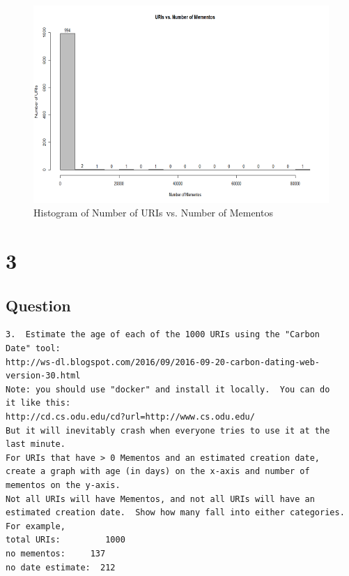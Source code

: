 \documentclass[letterpaper,11pt]{article}
\begin{document}

\begin{figure}[h]
\centering
\includegraphics[scale=1.0]{memuri.png}
\caption{Histogram of Number of URIs vs. Number of Mementos}
\label{fig:q2histogram}
\end{figure}
\clearpage
\section*{3}
\subsection*{Question}
\begin{verbatim}
3.  Estimate the age of each of the 1000 URIs using the "Carbon
Date" tool:
http://ws-dl.blogspot.com/2016/09/2016-09-20-carbon-dating-web-version-30.html
Note: you should use "docker" and install it locally.  You can do
it like this:
http://cd.cs.odu.edu/cd?url=http://www.cs.odu.edu/
But it will inevitably crash when everyone tries to use it at the
last minute.
For URIs that have > 0 Mementos and an estimated creation date,
create a graph with age (in days) on the x-axis and number of
mementos on the y-axis.
Not all URIs will have Mementos, and not all URIs will have an
estimated creation date.  Show how many fall into either categories.
For example,
total URIs:         1000
no mementos:     137  
no date estimate:  212
\end{verbatim}
\clearpage
\end{document}
